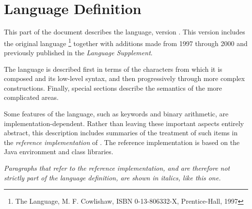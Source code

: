 \chapter{\nr{} Language Definition}\label{refpart3}
 
This part of the document describes the \nr{} language, version \nrversion{}.
This version includes the original \nr{} language
\footnote{
The \nr{} Language, M. F. Cowlishaw,
ISBN 0-13-806332-X, Prentice-Hall, 1997
}
together with additions made from 1997 through 2000 and previously
published in the \emph{\nr{} Language Supplement}.
 
The language is described first in terms of the characters from which it
is composed and its low-level syntax, and then progressively through
more complex constructions.
Finally, special sections describe the semantics of the more
complicated areas.
 
Some features of the language, such as  keywords and
binary arithmetic, are implementation-dependent.  Rather than leaving
these important aspects entirely abstract, this description includes
summaries of the treatment of such items in the \emph{reference
implementation} of \nr{}.  The reference implementation is based
on the Java environment and class libraries.
 
\emph{Paragraphs that refer to the reference implementation,
and are therefore not strictly part of the language definition, are
shown in italics, like this one.}
